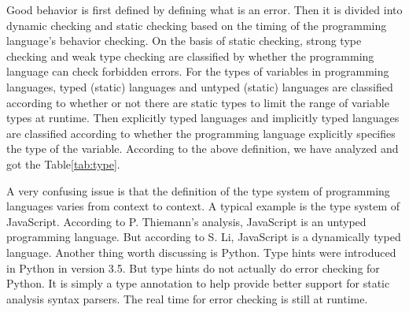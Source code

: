 Good behavior is first defined by defining what is an error.
Then it is divided into dynamic checking and static checking
based on the timing of the programming language's behavior checking.
On the basis of static checking, strong type checking and
weak type checking are classified by whether the programming
language can check forbidden errors.
For the types of variables
in programming languages, typed (static) languages and untyped
(static) languages are classified according to whether or not there
are static types to limit the range of variable types at runtime.
Then explicitly typed languages and implicitly typed languages are
classified according to whether the programming language explicitly
specifies the type of the variable.
According to the above definition,
we have analyzed and got the Table\ref{tab:type}.

A very confusing issue is that the definition of the type system of
programming languages varies from context to context.
A typical example is the type system of JavaScript.
According to P. Thiemann's analysis, JavaScript is an
untyped programming language\cite{thiemann2005towards}.
But according to S. Li, JavaScript is a dynamically
typed language\cite{dot2015analysis}.
Another thing worth discussing is Python.
Type hints were introduced in Python in version 3.5.
But type hints do not actually do error checking for Python.
It is simply a type annotation to help provide better support
for static analysis syntax parsers.
The real time for error checking is still at runtime.


